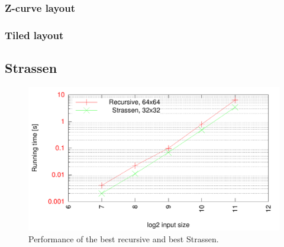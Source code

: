 \subsubsection{Z-curve layout}



\subsubsection{Tiled layout}





\subsection{Strassen}


\begin{figure}[h!]
  \centering
  \includegraphics[width=\textwidth]{"../project2/gnuplots/recursive_vs_strassen_performance"}
  \caption{Performance of the best recursive and best Strassen.}
  \label{fig:recursive_vs_strassen_performance}
\end{figure}

